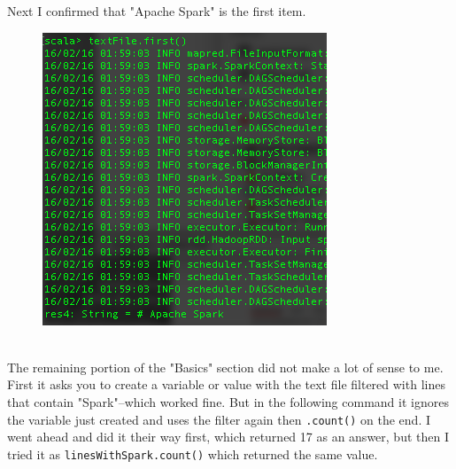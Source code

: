 \documentclass[10pt]{article}
\begin{document}
\hfill
{}%
\par
Next I confirmed that "Apache Spark" is the first item.
\begin{figure}[!h]
\includegraphics[scale=0.37]{first.png}
\centering
\end{figure}\\
\indent The remaining portion of the "Basics" section did not make a lot of sense to me. First it asks you to create a variable or value with the text file filtered with lines that contain "Spark"--which worked fine. But in the following command it ignores the variable just created and uses the filter again then \verb|.count()| on the end. I went ahead and did it their way first, which returned 17 as an answer, but then I tried it as \verb|linesWithSpark.count()| which returned the same value. 
\end{document}
